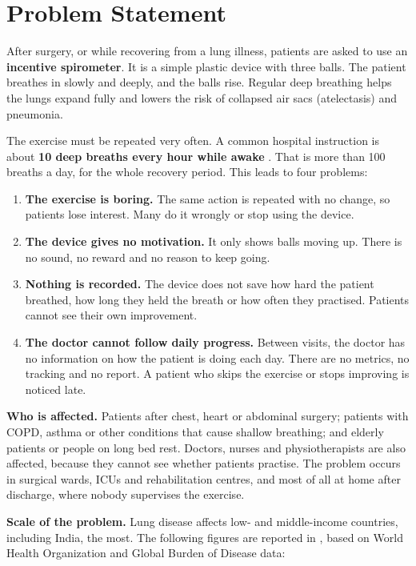 \documentclass[12pt,a4paper]{article}
\begin{document}
\section{Problem Statement}

After surgery, or while recovering from a lung illness, patients are asked to use an \textbf{incentive spirometer}. It is a simple plastic device with three balls. The patient breathes in slowly and deeply, and the balls rise. Regular deep breathing helps the lungs expand fully and lowers the risk of collapsed air sacs (atelectasis) and pneumonia.

The exercise must be repeated very often. A common hospital instruction is about \textbf{10 deep breaths every hour while awake} \cite{cleveland}. That is more than 100 breaths a day, for the whole recovery period. This leads to four problems:

\begin{enumerate}
  \item \textbf{The exercise is boring.} The same action is repeated with no change, so patients lose interest. Many do it wrongly or stop using the device.
  \item \textbf{The device gives no motivation.} It only shows balls moving up. There is no sound, no reward and no reason to keep going.
  \item \textbf{Nothing is recorded.} The device does not save how hard the patient breathed, how long they held the breath or how often they practised. Patients cannot see their own improvement.
  \item \textbf{The doctor cannot follow daily progress.} Between visits, the doctor has no information on how the patient is doing each day. There are no metrics, no tracking and no report. A patient who skips the exercise or stops improving is noticed late.
\end{enumerate}

\textbf{Who is affected.} Patients after chest, heart or abdominal surgery; patients with COPD, asthma or other conditions that cause shallow breathing; and elderly patients or people on long bed rest. Doctors, nurses and physiotherapists are also affected, because they cannot see whether patients practise. The problem occurs in surgical wards, ICUs and rehabilitation centres, and most of all at home after discharge, where nobody supervises the exercise.

\textbf{Scale of the problem.} Lung disease affects low- and middle-income countries, including India, the most. The following figures are reported in \cite{wallace}, based on World Health Organization and Global Burden of Disease data:
\end{document}
